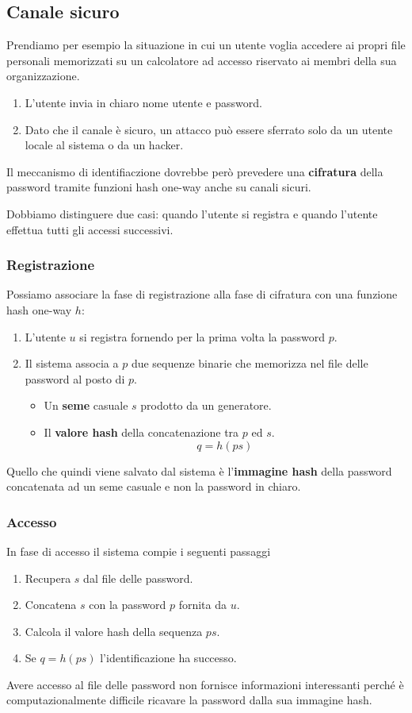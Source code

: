 \subsection{Canale sicuro}
Prendiamo per esempio la situazione in cui un utente voglia accedere ai propri file personali memorizzati su un
calcolatore ad accesso riservato ai membri della sua organizzazione.
\begin{enumerate}
	\item L'utente invia in chiaro nome utente e password.
	\item Dato che il canale \`e sicuro, un attacco pu\`o essere sferrato solo da un utente locale al sistema o da
	      un hacker.
\end{enumerate}
Il meccanismo di identifiaczione dovrebbe per\`o prevedere una \textbf{cifratura} della password tramite funzioni hash
one-way anche su canali sicuri.

Dobbiamo distinguere due casi: quando l'utente si registra e quando l'utente effettua tutti gli accessi successivi.

\subsubsection{Registrazione}
Possiamo associare la fase di registrazione alla fase di cifratura con una funzione hash one-way $h$:
\begin{enumerate}
	\item L'utente $u$ si registra fornendo per la prima volta la password $p$.
	\item Il sistema associa a $p$ due sequenze binarie che memorizza nel file delle password al posto di $p$.
	      \begin{itemize}
		      \item Un \textbf{seme} casuale $s$ prodotto da un generatore.
		      \item Il \textbf{valore hash} della concatenazione tra $p$ ed $s$.
		            \[ q = h(p s) \]
	      \end{itemize}
\end{enumerate}
Quello che quindi viene salvato dal sistema \`e l'\textbf{immagine hash} della password concatenata ad un seme casuale
e non la password in chiaro.

\subsubsection{Accesso}
In fase di accesso il sistema compie i seguenti passaggi
\begin{enumerate}
	\item Recupera $s$ dal file delle password.
	\item Concatena $s$ con la password $p$ fornita da $u$.
	\item Calcola il valore hash della sequenza $p s$.
	\item Se $q = h(p s)$ l'identificazione ha successo.
\end{enumerate}
Avere accesso al file delle password non fornisce informazioni interessanti perch\'e \`e computazionalmente difficile
ricavare la password dalla sua immagine hash.

